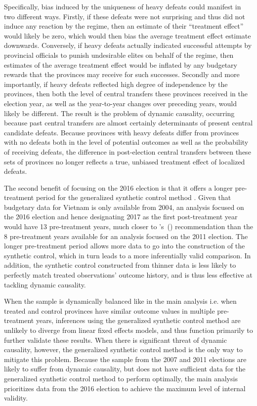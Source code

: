 \documentclass[12pt]{article}
\newcommand\citepos[1]{\citeauthor{#1}'s\ (\citeyear{#1})}
\newcommand{\1}{\mathbbm{1}}
\begin{document}
Specifically, bias induced by the uniqueness of heavy defeats could manifest in two different ways. Firstly, if these defeats were not surprising and thus did not induce any reaction by the regime, then an estimate of their ``treatment effect'' would likely be zero, which would then bias the average treatment effect estimate downwards. Conversely, if heavy defeats actually indicated successful attempts by provincial officials to punish undesirable elites on behalf of the regime, then estimates of the average treatment effect would be inflated by any budgetary rewards that the provinces may receive for such successes. Secondly and more importantly, if heavy defeats reflected high degree of independence by the provinces, then both the level of central transfers these provinces received in the election year, as well as the year-to-year changes over preceding years, would likely be different. The result is the problem of dynamic causality, occurring because past central transfers are almost certainly determinants of present central candidate defeats. Because provinces with heavy defeats differ from provinces with no defeats both in the level of potential outcomes as well as the probability of receiving defeats, the difference in post-election central transfers between these sets of provinces no longer reflects a true, unbiased treatment effect of localized defeats.

The second benefit of focusing on the 2016 election is that it offers a longer pre-treatment period for the generalized synthetic control method \citep{Xu2017gsynth}. Given that budgetary data for Vietnam is only available from 2004, an analysis focused on the 2016 election and hence designating 2017 as the first post-treatment year would have 13 pre-treatment years, much closer to \citepos{Abadie2010} recommendation than the 8 pre-treatment years available for an analysis focused on the 2011 election. The longer pre-treatment period allows more data to go into the construction of the synthetic control, which in turn leads to a more inferentially valid comparison. In addition, the synthetic control constructed from thinner data is less likely to perfectly match treated observations' outcome history, and is thus less effective at tackling dynamic causality.

When the sample is dynamically balanced like in the main analysis i.e. when treated and control provinces have similar outcome values in multiple pre-treatment years, inferences using the generalized synthetic control method are unlikely to diverge from linear fixed effects models, and thus function primarily to further validate these results. When there is significant threat of dynamic causality, however, the generalized synthetic control method is the only way to mitigate this problem. Because the sample from the 2007 and 2011 elections are likely to suffer from dynamic causality, but does not have sufficient data for the generalized synthetic control method to perform optimally, the main analysis prioritizes data from the 2016 election to achieve the maximum level of internal validity.
\end{document}
